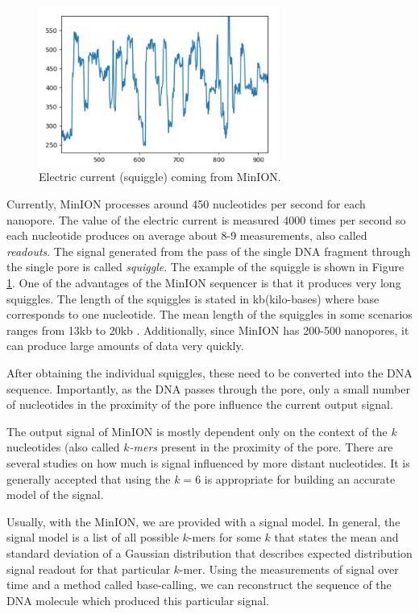 \begin{figure}
\centerline{\includegraphics[width=0.7\textwidth, height=0.3\textheight]{images/signal}}
\caption[MinION signal]{Electric current (squiggle) coming from MinION.}
\label{obr:minIonCurrent}
\end{figure}

Currently, MinION processes around 450 nucleotides per second for each nanopore.
The value of the electric current is measured 4000 times per second so each
nucleotide produces on average about 8-9 measurements, also called \textit{readouts}. The signal
generated from the pass of the single DNA fragment through the single pore is called \textit{squiggle}.
The example of the squiggle is shown in Figure \ref{obr:minIonCurrent}.
One of the advantages of the MinION sequencer is that it produces very long squiggles.
The length of the squiggles is stated in kb(kilo-bases) where base corresponds to one nucleotide.
The mean length of the squiggles in some scenarios ranges from 13kb to 20kb \cite{tyson2018minion}. Additionally,
since MinION has 200-500 nanopores, it can produce large amounts of data very quickly.

After obtaining the individual squiggles, these need to be converted into the DNA
sequence. Importantly, as the DNA passes through the pore, only a small
number of nucleotides in the proximity of the pore influence the current output signal.

The output signal of MinION is mostly dependent only on the context of the $k$
nucleotides (also called \textit{$k$-mers} present in the proximity of the pore. There are several studies on
how much is signal influenced by more distant nucleotides. It is generally accepted
that using the $k = 6$ is appropriate for building an accurate model of the signal. 

Usually, with the MinION, we are provided with a signal model.
In general, the signal model is a list of all possible $k$-mers for some $k$
that states the mean and standard deviation of a Gaussian distribution that
describes expected distribution signal readout for that particular $k$-mer.
Using the measurements of signal over time and a method called base-calling, we can reconstruct
the sequence of the DNA molecule which produced this particular signal.

